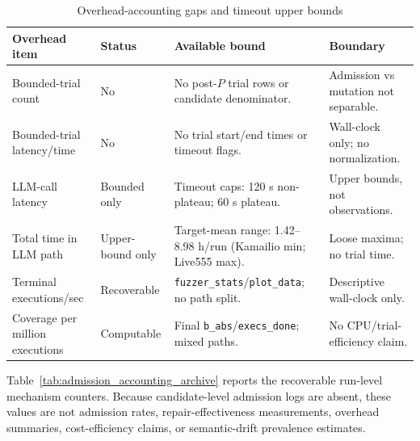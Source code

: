 \documentclass[final,5p,times,number]{elsarticle}
\begin{document}
\begin{table}[!t]
\centering
\caption{Overhead-accounting gaps and timeout upper bounds}
\label{tab:overhead_accounting_gap}
{\scriptsize
\setlength{\tabcolsep}{3.2pt}
\renewcommand{\arraystretch}{1.05}
\begin{tabularx}{\textwidth}{>{\raggedright\arraybackslash}p{}
                              >{\raggedright\arraybackslash}p{}
                              >{\raggedright\arraybackslash}p{}
                              X}
\toprule
\textbf{Overhead item} & \textbf{Status} & \textbf{Available bound} & \textbf{Boundary} \\
\midrule
Bounded-trial count &
No &
No post-$P$ trial rows or candidate denominator. &
Admission vs mutation not separable. \\
\midrule
Bounded-trial latency/time &
No &
No trial start/end times or timeout flags. &
Wall-clock only; no normalization. \\
\midrule
LLM-call latency &
Bounded only &
Timeout caps: 120 s non-plateau; 60 s plateau. &
Upper bounds, not observations. \\
\midrule
Total time in LLM path &
Upper-bound only &
Target-mean range: 1.42--8.98 h/run (Kamailio min; Live555 max). &
Loose maxima; no trial time. \\
\midrule
Terminal executions/sec &
Recoverable &
\texttt{fuzzer\_stats}/\texttt{plot\_data}; no path split. &
Descriptive wall-clock only. \\
\midrule
Coverage per million executions &
Computable &
Final \texttt{b\_abs}/\texttt{execs\_done}; mixed paths. &
No CPU/trial-efficiency claim. \\
\bottomrule
\end{tabularx}
}
\end{table}

Table~\ref{tab:admission_accounting_archive} reports the recoverable run-level mechanism counters. Because candidate-level admission logs are absent, these values are not admission rates, repair-effectiveness measurements, overhead summaries, cost-efficiency claims, or semantic-drift prevalence estimates.
\end{document}
